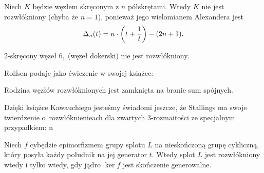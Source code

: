 \begin{example}
%
    Niech $K$ będzie węzłem skręconym z $n$ półskrętami.
    Wtedy $K$ nie jest rozwłókniony (chyba że $n = 1$), ponieważ jego wielomianem Alexandera jest
%
    \begin{equation}
        \Delta_n(t) = n \cdot \left(t + \frac 1 t \right) - (2n+1).
    \end{equation}
\end{example}

\begin{corollary}
    $2$-skręcony węzeł $6_1$ (węzeł dokerski) nie jest rozwłókniony.
\end{corollary}

Rolfsen \cite[s. 326]{rolfsen76} podaje jako ćwiczenie w swojej książce:

\begin{proposition}
%
    Rodzina węzłów rozwłóknionych jest zamknięta na branie sum spójnych.
\end{proposition}

Dzięki książce Kawauchiego \cite[s. 84]{kawauchi96} jesteśmy świadomi jeszcze, że Stallings ma swoje twierdzenie o~rozwłóknienieach dla zwartych 3-rozmaitości ze specjalnym przypadkiem:
%
n
\begin{proposition}
    Niech $f$ cybędzie epimorfizmem grupy splotu $L$ na nieskończoną grupę cykliczną, który posyła każdy południk na jej generator $t$. %
    Wtedy splot $L$ jest rozwłókniony wtedy i tylko wtedy, gdy jądro $\ker f$ jest skończenie generowalne.
\end{proposition}

%


